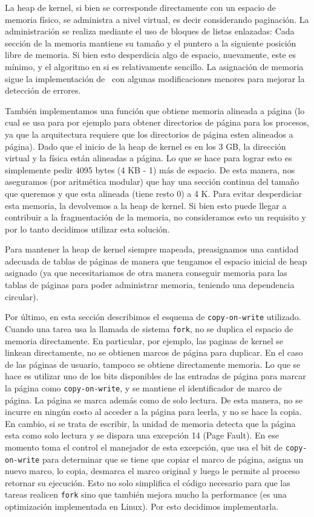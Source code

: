 La heap de kernel, si bien se corresponde directamente con un espacio de memoria f\'isico, se administra a nivel virtual, es decir considerando
paginaci\'on. La administraci\'on se realiza mediante el uso de bloques de listas enlazadas: Cada secci\'on de la memoria mantiene su tama\~no
y el puntero a la siguiente posici\'on libre de memoria. Si bien esto desperdicia algo de espacio, nuevamente, este es m\'inimo, y el algoritmo
en si es relativamente sencillo. La asignaci\'on de memoria sigue la implementaci\'on de~\cite{kr} con algunas modificaciones menores para
mejorar la detecci\'on de errores. 

Tambi\'en implementamos una funci\'on que obtiene memoria alineada a p\'agina (lo cual se usa para por ejemplo para obtener directorios de p\'agina para los procesos, ya que la arquitectura requiere que los directorios de p\'agina esten alineados a p\'agina). Dado que el inicio de la heap de kernel es en los 3 GB, la direcci\'on virtual y la f\'isica est\'an alineadas a p\'agina. Lo que se hace para lograr esto es simplemente
pedir 4095 bytes (4 KB - 1) m\'as de espacio. De esta manera, nos aseguramos (por aritm\'etica modular) que hay una secci\'on continua del
tama\~no que queremos y que esta alineada (tiene resto 0) a 4 K. Para evitar desperdiciar esta memoria, la devolvemos a la heap de kernel. Si
bien esto puede llegar a contribuir a la fragmentaci\'on de la memoria, no consideramos esto un requisito y por lo tanto decidimos utilizar
esta soluci\'on.

Para mantener la heap de kernel siempre mapeada, preasignamos una cantidad adecuada de tablas de p\'aginas de manera que tengamos el espacio
inicial de heap asignado (ya que necesitariamos de otra manera conseguir memoria para las tablas de p\'aginas para poder administrar memoria,
teniendo una dependencia circular).

Por \'ultimo, en esta secci\'on describimos el esquema de \texttt{copy-on-write} utilizado. Cuando una tarea usa la llamada de sistema
\texttt{fork}, no se duplica el espacio de memoria directamente. En particular, por ejemplo, las paginas de kernel se linkean directamente,
no se obtienen marcos de p\'agina para duplicar. En el caso de las p\'aginas de usuario, tampoco se obtiene directamente memoria. Lo que se
hace es utilizar uno de los bits disponibles de las entradas de p\'agina para marcar la p\'agina como \texttt{copy-on-write}, y se mantiene
el identificador de marco de p\'agina. La p\'agina se marca adem\'as como de solo lectura. De esta manera, no se incurre en ning\'un costo
al acceder a la p\'agina para leerla, y no se hace la copia. En cambio, si se trata de escribir, la unidad de memoria detecta que la p\'agina
esta como solo lectura y se dispara una excepci\'on 14 (Page Fault). En ese momento toma el control el manejador de esta excepci\'on, que
usa el bit de \texttt{copy-on-write} para determinar que se tiene que copiar el marco de p\'agina, asigna un nuevo marco, lo copia, desmarca
el marco original y luego le permite al proceso retornar su ejecuci\'on. Esto no solo simplifica el c\'odigo necesario para que las tareas
realicen \texttt{fork} sino que tambi\'en mejora mucho la performance (es una optimizaci\'on implementada en Linux). Por esto decidimos
implementarla.

